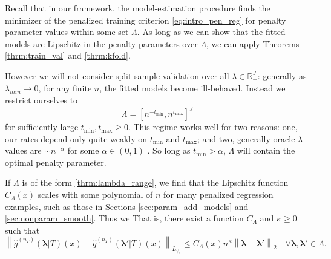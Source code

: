 \documentclass[12pt]{article} %
\theoremstyle{definition}
\begin{document}
Recall that in our framework, the model-estimation procedure finds the minimizer of the penalized training criterion \eqref{eq:intro_pen_reg} for penalty parameter values within some set $\Lambda$. As long as we can show that the fitted models are Lipschitz in the penalty parameters over $\Lambda$, we can apply Theorems \ref{thrm:train_val} and \ref{thrm:kfold}.

However we will not consider split-sample validation over all $\lambda\in\mathbb{R}^J_+$: generally as $\lambda_{min} \rightarrow 0$, for any finite $n$, the fitted models become ill-behaved. Instead we restrict ourselves to 
\begin{equation}
\label{thrm:lambda_range}
\Lambda = [ n^{-t_{\min}}, n^{t_{\max}}]^J
\end{equation}
for sufficiently large $t_{\min}, t_{\max} \ge 0$. This regime works well for two reasons: one, our rates depend only quite weakly on $t_{\min}$ and $t_{\max}$; and two, generally oracle $\lambda$-values are $\sim n^{-\alpha}$ for some $\alpha \in (0,1)$ \citep{van2000empirical, van2014additive, buhlmann2011statistics}. So long as $t_{\min} > \alpha$, $\Lambda$ will contain the optimal penalty parameter.

If $\Lambda$ is of the form \eqref{thrm:lambda_range}, we find that the Lipschitz function $C_\Lambda(x)$ scales with some polynomial of $n$ for many penalized regression examples, such as those in Sections \ref{sec:param_add_models} and \ref{sec:nonparam_smooth}.
Thus we That is, there exist a function $C_\Lambda$ and $\kappa \ge 0$ such that
\begin{equation}
\label{thrm:lipschitz_pen_reg}
\left \| \hat{g}^{(n_T)}(\boldsymbol{\lambda}|T)(x) - \hat{g}^{(n_T)}(\boldsymbol{\lambda}'|T)(x) \right \|_{L_{\psi_1}}
\le C_\Lambda(x) n^\kappa \left \| \boldsymbol{\lambda} - \boldsymbol{\lambda}' \right \|_2 \quad \forall \boldsymbol{\lambda}, \boldsymbol{\lambda}' \in \Lambda.
\end{equation}
\end{document}
